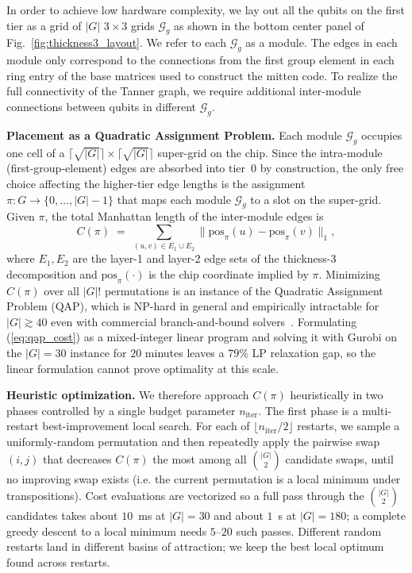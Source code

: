 In order to achieve low hardware complexity, we lay out all the qubits on the first tier as a grid of $|G|$ $3 \times 3$ grids $\mathcal{G}_g$ as shown in the bottom center panel of Fig.~\ref{fig:thickness3_layout}. We refer to each $\mathcal{G}_g$ as a module. The edges in each module only correspond to the connections from the first group element in each ring entry of the base matrices used to construct the mitten code. To realize the full connectivity of the Tanner graph, we require additional inter-module connections between qubits in different $\mathcal{G}_g$.

\smallskip
\noindent\textbf{Placement as a Quadratic Assignment Problem.}
Each module $\mathcal{G}_g$ occupies one cell of a $\lceil\sqrt{|G|}\rceil \times \lceil\sqrt{|G|}\rceil$ super-grid on the chip. Since the intra-module (first-group-element) edges are absorbed into tier~0 by construction, the only free choice affecting the higher-tier edge lengths is the assignment $\pi : G \to \{0,\ldots,|G|-1\}$ that maps each module $\mathcal{G}_g$ to a slot on the super-grid. Given $\pi$, the total Manhattan length of the inter-module edges is
\begin{equation}
    C(\pi) \;=\; \sum_{(u,v)\in E_{1}\cup E_{2}} \bigl\lVert \mathrm{pos}_\pi(u) - \mathrm{pos}_\pi(v)\bigr\rVert_1,
    \label{eq:qap_cost}
\end{equation}
where $E_1,E_2$ are the layer-1 and layer-2 edge sets of the thickness-3 decomposition and $\mathrm{pos}_\pi(\cdot)$ is the chip coordinate implied by $\pi$. Minimizing $C(\pi)$ over all $|G|!$ permutations is an instance of the Quadratic Assignment Problem (QAP), which is NP-hard in general and empirically intractable for $|G|\gtrsim 40$ even with commercial branch-and-bound solvers~\cite{qap_survey}. Formulating (\ref{eq:qap_cost}) as a mixed-integer linear program and solving it with Gurobi on the $|G|=30$ instance for $20$ minutes leaves a $79\%$ LP relaxation gap, so the linear formulation cannot prove optimality at this scale.

\smallskip
\noindent\textbf{Heuristic optimization.}
We therefore approach $C(\pi)$ heuristically in two phases controlled by a single budget parameter $n_\mathrm{iter}$. The first phase is a multi-restart best-improvement local search. For each of $\lfloor n_\mathrm{iter}/2 \rfloor$ restarts, we sample a uniformly-random permutation and then repeatedly apply the pairwise swap $(i,j)$ that decreases $C(\pi)$ the most among all $\binom{|G|}{2}$ candidate swaps, until no improving swap exists (i.e. the current permutation is a local minimum under transpositions). Cost evaluations are vectorized so a full pass through the $\binom{|G|}{2}$ candidates takes about $10$~ms at $|G|=30$ and about $1$~s at $|G|=180$; a complete greedy descent to a local minimum needs $5$–$20$ such passes. Different random restarts land in different basins of attraction; we keep the best local optimum found across restarts.

